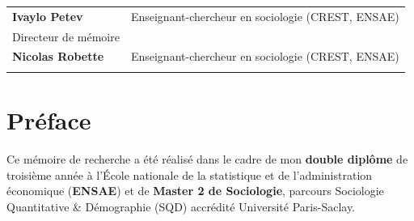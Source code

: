 \documentclass[12pt,a4paper]{reedthesis}
\begin{document}
\begin{titlepage}
\scriptsize
{}
\begin{tabular}{|p{4cm}l}
\textbf{Ivaylo Petev} &  Enseignant-chercheur en sociologie (CREST, ENSAE)\\
Directeur de mémoire & \\
\textbf{Nicolas Robette} &  Enseignant-chercheur en sociologie (CREST, ENSAE)\\
 & \\
\end{tabular}

\end{titlepage}
\addamargin %

\frontmatter %
\pagestyle{empty} %



% 
  \hypersetup{linkcolor=black}
  \setcounter{secnumdepth}{2}
  \setcounter{tocdepth}{2}
  \tableofcontents




\mainmatter %
\pagestyle{fancyplain} %

\hypertarget{pruxe9face}{%
\chapter*{Préface}\label{pruxe9face}}

Ce mémoire de recherche a été réalisé dans le cadre de mon \textbf{double diplôme} de troisième année à l'École nationale de la statistique et de l'administration économique (\textbf{ENSAE}) et de \textbf{Master 2 de Sociologie}, parcours Sociologie Quantitative \& Démographie (SQD) accrédité Université Paris-Saclay.
\end{document}
